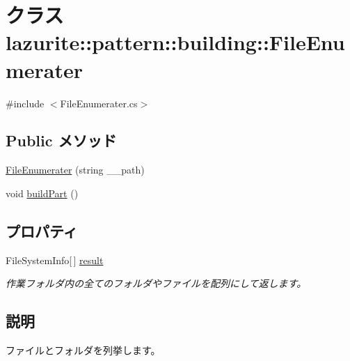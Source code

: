 \hypertarget{classlazurite_1_1pattern_1_1building_1_1_file_enumerater}{
\section{クラス lazurite::pattern::building::FileEnumerater}
\label{classlazurite_1_1pattern_1_1building_1_1_file_enumerater}
}


{\ttfamily \#include $<$FileEnumerater.cs$>$}\subsection*{Public メソッド}
\begin{DoxyCompactItemize}
\item 
\hyperlink{classlazurite_1_1pattern_1_1building_1_1_file_enumerater_a0d646d88f01d88edb4754a1fedda9e54}{FileEnumerater} (string \_\-\_\-path)
\item 
void \hyperlink{classlazurite_1_1pattern_1_1building_1_1_file_enumerater_a6a61e899e3e32b1e3a46be161ce2f4c7}{buildPart} ()
\end{DoxyCompactItemize}
\subsection*{プロパティ}
\begin{DoxyCompactItemize}
\item 
FileSystemInfo\mbox{[}$\,$\mbox{]} \hyperlink{classlazurite_1_1pattern_1_1building_1_1_file_enumerater_af944c11a4a5d20be87f757d8cdef5688}{result}
\begin{DoxyCompactList}\small\item\em 作業フォルダ内の全てのフォルダやファイルを配列にして返します。 \item\end{DoxyCompactList}\end{DoxyCompactItemize}


\subsection{説明}
ファイルとフォルダを列挙します。 


